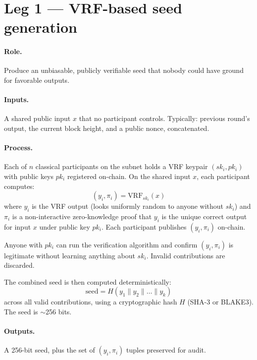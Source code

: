 \documentclass[11pt]{article}
\begin{document}
\section{Leg 1 --- VRF-based seed generation}

\paragraph{Role.} Produce an unbiasable, publicly verifiable seed that nobody could have ground for favorable outputs.

\paragraph{Inputs.} A shared public input $x$ that no participant controls. Typically: previous round's output, the current block height, and a public nonce, concatenated.

\paragraph{Process.} Each of $n$ classical participants on the subnet holds a VRF keypair $(sk_i, pk_i)$ with public keys $pk_i$ registered on-chain. On the shared input $x$, each participant computes:
\[
(y_i, \pi_i) = \text{VRF}_{sk_i}(x)
\]
where $y_i$ is the VRF output (looks uniformly random to anyone without $sk_i$) and $\pi_i$ is a non-interactive zero-knowledge proof that $y_i$ is the unique correct output for input $x$ under public key $pk_i$. Each participant publishes $(y_i, \pi_i)$ on-chain.

Anyone with $pk_i$ can run the verification algorithm and confirm $(y_i, \pi_i)$ is legitimate without learning anything about $sk_i$. Invalid contributions are discarded.

The combined seed is then computed deterministically:
\[
\text{seed} = H(y_1 \| y_2 \| \ldots \| y_k)
\]
across all valid contributions, using a cryptographic hash $H$ (SHA-3 or BLAKE3). The seed is $\sim$256 bits.

\paragraph{Outputs.} A 256-bit seed, plus the set of $(y_i, \pi_i)$ tuples preserved for audit.
\end{document}
